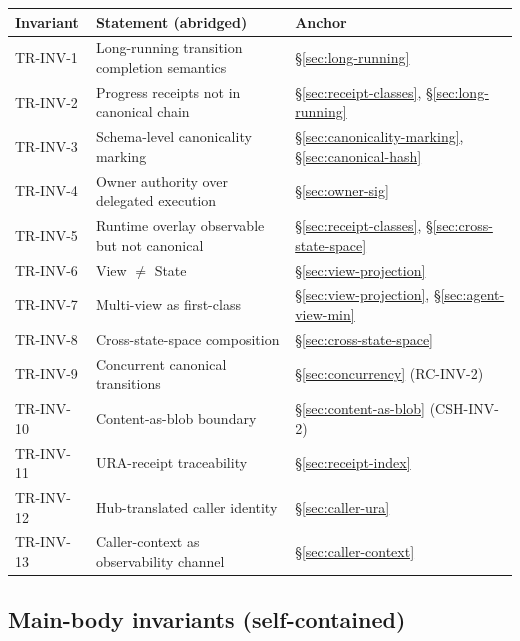 \documentclass[11pt,a4paper]{article}
\theoremstyle{definition}
\begin{document}
\begin{center}
\renewcommand{\arraystretch}{1.25}
\begin{tabularx}{\linewidth}{l X l}
\toprule
\textbf{Invariant} & \textbf{Statement (abridged)} & \textbf{Anchor} \\
\midrule
TR-INV-1  & Long-running transition completion semantics       & \S\ref{sec:long-running} \\
TR-INV-2  & Progress receipts not in canonical chain           & \S\ref{sec:receipt-classes}, \S\ref{sec:long-running} \\
TR-INV-3  & Schema-level canonicality marking                  & \S\ref{sec:canonicality-marking}, \S\ref{sec:canonical-hash} \\
TR-INV-4  & Owner authority over delegated execution           & \S\ref{sec:owner-sig} \\
TR-INV-5  & Runtime overlay observable but not canonical       & \S\ref{sec:receipt-classes}, \S\ref{sec:cross-state-space} \\
TR-INV-6  & View $\neq$ State                                  & \S\ref{sec:view-projection} \\
TR-INV-7  & Multi-view as first-class                          & \S\ref{sec:view-projection}, \S\ref{sec:agent-view-min} \\
TR-INV-8  & Cross-state-space composition                      & \S\ref{sec:cross-state-space} \\
TR-INV-9  & Concurrent canonical transitions                   & \S\ref{sec:concurrency} (RC-INV-2) \\
TR-INV-10 & Content-as-blob boundary                           & \S\ref{sec:content-as-blob} (CSH-INV-2) \\
TR-INV-11 & URA-receipt traceability                           & \S\ref{sec:receipt-index} \\
TR-INV-12 & Hub-translated caller identity                     & \S\ref{sec:caller-ura} \\
TR-INV-13 & Caller-context as observability channel            & \S\ref{sec:caller-context} \\
\bottomrule
\end{tabularx}
\end{center}

\subsection{Main-body invariants (self-contained)}
\end{document}
